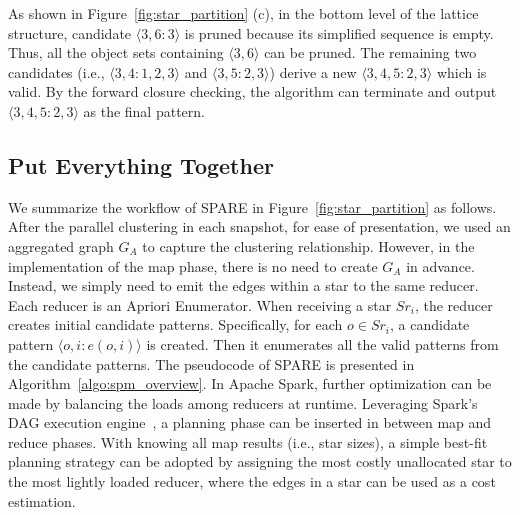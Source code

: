 \begin{example}
As shown in Figure~\ref{fig:star_partition} (c), in the bottom level of the lattice structure, candidate $\langle 3,6:3 \rangle $ is pruned because its simplified sequence is empty. Thus, all the object sets containing $\langle 3,6 \rangle $ can be pruned. The remaining two candidates (i.e., $\langle 3,4:1,2,3 \rangle$ and $\langle 3,5:2,3 \rangle$)  derive a new  $\langle 3,4,5:2,3 \rangle$ which is valid. By the forward closure checking, the algorithm can terminate and output $\langle 3,4,5:2,3 \rangle$ as the final pattern.
\end{example}


\subsection{Put Everything Together}
We summarize the workflow of SPARE in Figure~\ref{fig:star_partition} as follows. After the parallel clustering in each snapshot, for ease of presentation, we used an aggregated graph $G_A$ to capture the clustering relationship. However, in the implementation of the map phase, there is no need to create $G_A$ in advance. Instead, we simply need to emit the edges within a star to the same reducer. 
Each reducer is an Apriori Enumerator. When receiving a star $Sr_i$, the reducer creates initial candidate patterns. Specifically, for each $o \in Sr_i$, a candidate pattern $\langle o,i: e(o,i) \rangle$ is created. Then it enumerates all the valid patterns from the candidate patterns. The pseudocode of SPARE is presented in Algorithm~\ref{algo:spm_overview}.  
In Apache Spark, further optimization can be made by balancing the loads among reducers at runtime. 
Leveraging
Spark's DAG execution engine~\cite{zaharia2012resilient}, a planning phase can be inserted in between map and reduce phases.
With knowing all map results (i.e., star sizes), a simple best-fit planning strategy can be adopted by assigning the most costly unallocated star to the most lightly loaded reducer, where the edges in a star can be used as a cost estimation.

